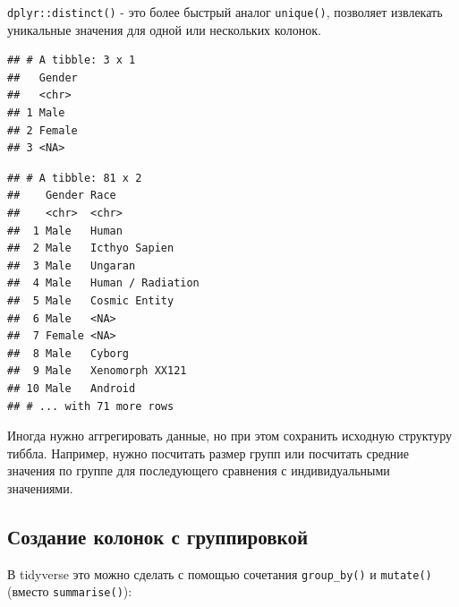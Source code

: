 \documentclass[]{book}
\newenvironment{Shaded}{\begin{snugshade}}{\end{snugshade}}
\newcommand{\KeywordTok}[1]{\textcolor[rgb]{0.13,0.29,0.53}{\textbf{#1}}}
\newcommand{\DataTypeTok}[1]{\textcolor[rgb]{0.13,0.29,0.53}{#1}}
\newcommand{\StringTok}[1]{\textcolor[rgb]{0.31,0.60,0.02}{#1}}
\newcommand{\OperatorTok}[1]{\textcolor[rgb]{0.81,0.36,0.00}{\textbf{#1}}}
\newcommand{\NormalTok}[1]{#1}
\begin{document}
\texttt{dplyr::distinct()} - это более быстрый аналог \texttt{unique()},
позволяет извлекать уникальные значения для одной или нескольких
колонок.

\begin{Shaded}
\end{Shaded}

\begin{verbatim}
## # A tibble: 3 x 1
##   Gender
##   <chr> 
## 1 Male  
## 2 Female
## 3 <NA>
\end{verbatim}

\begin{Shaded}
\end{Shaded}

\begin{verbatim}
## # A tibble: 81 x 2
##    Gender Race             
##    <chr>  <chr>            
##  1 Male   Human            
##  2 Male   Icthyo Sapien    
##  3 Male   Ungaran          
##  4 Male   Human / Radiation
##  5 Male   Cosmic Entity    
##  6 Male   <NA>             
##  7 Female <NA>             
##  8 Male   Cyborg           
##  9 Male   Xenomorph XX121  
## 10 Male   Android          
## # ... with 71 more rows
\end{verbatim}

Иногда нужно аггрегировать данные, но при этом сохранить исходную
структуру тиббла. Например, нужно посчитать размер групп или посчитать
средние значения по группе для последующего сравнения с индивидуальными
значениями.

\subsection{Создание колонок с группировкой}\label{tidy_group_mutate}

В tidyverse это можно сделать с помощью сочетания \texttt{group\_by()} и
\texttt{mutate()} (вместо \texttt{summarise()}):

\begin{Shaded}
\end{Shaded}
\end{document}
